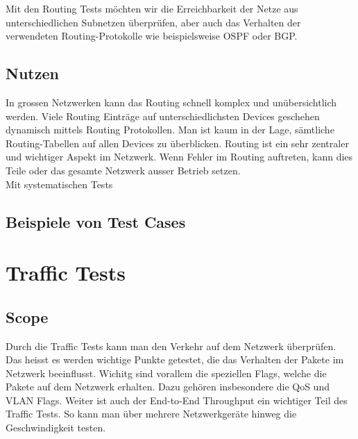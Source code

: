 \documentclass[a4,12pt]{scrartcl}
\begin{document}
\noindent Mit den Routing Tests möchten wir die Erreichbarkeit der Netze aus unterschiedlichen Subnetzen überprüfen, aber auch das Verhalten der verwendeten Routing-Protokolle wie beispielsweise OSPF oder BGP. 
\subsection{Nutzen}
In grossen Netzwerken kann das Routing schnell komplex und unübersichtlich werden. Viele Routing Einträge auf unterschiedlichsten Devices geschehen dynamisch mittels Routing Protokollen. Man ist kaum in der Lage, sämtliche Routing-Tabellen auf allen Devices zu überblicken. Routing ist ein sehr zentraler und wichtiger Aspekt im Netzwerk. Wenn Fehler im Routing auftreten, kann dies Teile oder das gesamte Netzwerk ausser Betrieb setzen.\\

\noindent Mit systematischen Tests 
\subsection{Beispiele von Test Cases}

\section{Traffic Tests}
\subsection{Scope}
Durch die Traffic Tests kann man den Verkehr auf dem Netzwerk überprüfen. Das heisst es werden wichtige Punkte getestet, die das Verhalten der Pakete im Netzwerk beeinflusst. Wichitg sind vorallem die speziellen Flags, welche die Pakete auf dem Netzwerk erhalten. Dazu gehören insbesondere die QoS und VLAN Flags.\newline
Weiter ist auch der End-to-End Throughput ein wichtiger Teil des Traffic Tests. So kann man über mehrere Netzwerkgeräte hinweg die Geschwindigkeit testen.
\end{document}
